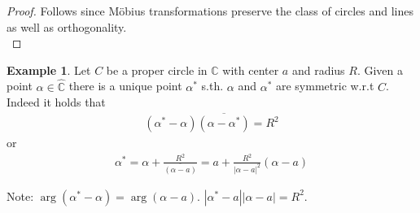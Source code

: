 \documentclass[12pt, a4paper]{article}
\theoremstyle{plain}
\theoremstyle{definition}
\newtheorem{example}{Example} %
\begin{document}
			\begin{proof}
				Follows since Möbius transformations preserve the class of circles and lines as well as orthogonality.\\
			\end{proof}

			\begin{example}
				Let $C$ be a proper circle in $\mathbb{C}$ with center $a$ and radius $R$. Given a point $\alpha\in\hat{\mathbb{C}}$ there is a unique point $\alpha^*$ s.th. $\alpha$ and $\alpha^*$ are symmetric w.r.t $C$. Indeed it holds that
				\begin{align*}
					(\alpha^*-\alpha)\overline{(\alpha- \alpha^*)} = R^2
				\end{align*}
				or
				\begin{align*}
					\alpha^* = \alpha + \frac{R^2}{\overline{(\alpha- a)}} = a + \frac{R^2}{|\alpha-a|^2}(\alpha-a)
				\end{align*}
			\end{example}
			Note: $\arg(\alpha^*- \alpha) = \arg(\alpha-a)$. $|\alpha^*- a||\alpha-a| = R^2$.
\end{document}
